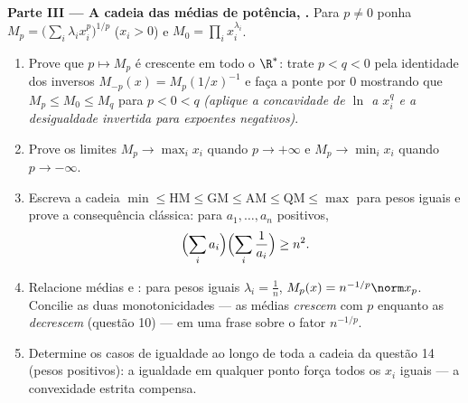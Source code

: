 \begin{problem}
\medskip
\noindent\textbf{Parte III --- A cadeia das médias de potência, .}
Para $p \neq 0$ ponha $M_p = \bigl(\sum_i\lambda_i
x_i^p\bigr)^{1/p}$ ($x_i > 0$) e $M_0 = \prod_i
x_i^{\lambda_i}$.
\begin{enumerate}[resume]
  \item Prove que $p \mapsto M_p$ é crescente em todo o
        $\R^*$: trate $p < q < 0$ pela identidade dos inversos
        $M_{-p}(x) = M_p(1/x)^{-1}$ e faça a ponte por $0$
        mostrando que $M_p \leq M_0 \leq M_q$ para $p < 0 < q$
        \emph{(aplique a concavidade de $\ln$ a $x_i^q$ e a
        desigualdade invertida para expoentes negativos)}.
  \item Prove os limites $M_p \to \max_i x_i$ quando $p \to
        +\infty$ e $M_p \to \min_i x_i$ quando $p \to -\infty$.
  \item Escreva a cadeia $\min \leq \mathrm{HM} \leq
        \mathrm{GM} \leq \mathrm{AM} \leq \mathrm{QM} \leq
        \max$ para pesos iguais e prove a consequência
        clássica: para $a_1, \dots, a_n$ positivos,
        \[
        \Bigl(\sum_i a_i\Bigr)\Bigl(\sum_i\frac1{a_i}\Bigr)
        \geq n^2 .
        \]
  \item Relacione médias e : para pesos iguais $\lambda_i =
        \frac1n$, $M_p(x) = n^{-1/p}\norm x_p$. Concilie as
        duas monotonicidades --- as médias \emph{crescem} com $p$
        enquanto as  \emph{decrescem} (questão 10) --- em uma
        frase sobre o fator $n^{-1/p}$.
  \item Determine os casos de igualdade ao longo de toda a cadeia da
        questão 14 (pesos positivos): a igualdade em qualquer ponto
        força todos os $x_i$ iguais --- a convexidade estrita compensa.
\end{enumerate}


\end{problem}
